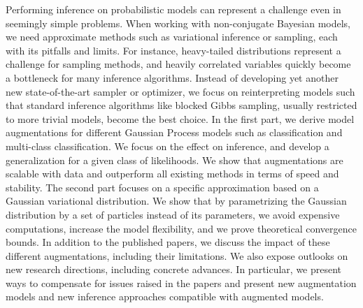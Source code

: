 
\ifCLASSINFOlangDE
{}
\fi

\begin{abstracts}        %
Performing inference on probabilistic models can represent a challenge even in seemingly simple problems.
When working with non-conjugate Bayesian models, we need approximate methods such as variational inference or sampling, each with its pitfalls and limits.
For instance, heavy-tailed distributions represent a challenge for sampling methods, and heavily correlated variables quickly become a bottleneck for many inference algorithms.
Instead of developing yet another new state-of-the-art sampler or optimizer, we focus on reinterpreting models such that standard inference algorithms like blocked Gibbs sampling, usually restricted to more trivial models, become the best choice.
In the first part, we derive model augmentations for different Gaussian Process models such as classification and multi-class classification.
We focus on the effect on inference, and develop a generalization for a given class of likelihoods.
We show that augmentations are scalable with data and outperform all existing methods in terms of speed and stability.
The second part focuses on a specific approximation based on a Gaussian variational distribution.
We show that by parametrizing the Gaussian distribution by a set of particles instead of its parameters, we avoid expensive computations, increase the model flexibility, and we prove theoretical convergence bounds.
In addition to the published papers, we discuss the impact of these different augmentations, including their limitations.
We also expose outlooks on new research directions, including concrete advances.
In particular, we present ways to compensate for issues raised in the papers and present new augmentation models and new inference approaches compatible with augmented models.
\end{abstracts}
\ifCLASSINFOlangDE
{}
\fi

